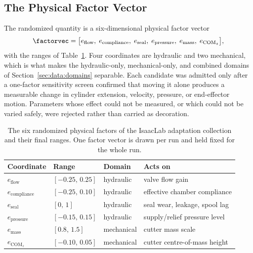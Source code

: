 \subsection{The Physical Factor Vector}
\label{sec:data:factors}

The randomized quantity is a six-dimensional physical factor vector
%
\begin{equation}
  \label{eq:data:factorvec}
  \factorvec = \bigl[
    e_{\mathrm{flow}},\;
    e_{\mathrm{compliance}},\;
    e_{\mathrm{seal}},\;
    e_{\mathrm{pressure}},\;
    e_{\mathrm{mass}},\;
    e_{\mathrm{COM}_z}
  \bigr],
\end{equation}
%
with the ranges of Table~\ref{tab:data:factors}. Four coordinates are
hydraulic and two mechanical, which is what makes the hydraulic-only,
mechanical-only, and combined domains of
Section~\ref{sec:data:domains} separable. Each candidate was admitted
only after a one-factor sensitivity screen confirmed that moving it
alone produces a measurable change in cylinder extension, velocity,
pressure, or end-effector motion. Parameters whose effect could not be
measured, or which could not be varied safely, were rejected rather than
carried as decoration.

\begin{table}[tb]
  \centering
  \caption{The six randomized physical factors of the IsaacLab
  adaptation collection and their final ranges. One factor vector is
  drawn per run and held fixed for the whole run.}
  \label{tab:data:factors}
  \small
  \begin{tabular}{llll}
    \toprule
    Coordinate & Range & Domain & Acts on \\
    \midrule
    $e_{\mathrm{flow}}$       & $[-0.25,\, 0.25]$ & hydraulic  & valve flow gain \\
    $e_{\mathrm{compliance}}$ & $[-0.25,\, 0.10]$ & hydraulic  & effective chamber compliance \\
    $e_{\mathrm{seal}}$       & $[0,\, 1]$        & hydraulic  & seal wear, leakage, spool lag \\
    $e_{\mathrm{pressure}}$   & $[-0.15,\, 0.15]$ & hydraulic  & supply/relief pressure level \\
    $e_{\mathrm{mass}}$       & $[0.8,\, 1.5]$    & mechanical & cutter mass scale \\
    $e_{\mathrm{COM}_z}$      & $[-0.10,\, 0.05]$ & mechanical & cutter centre-of-mass height \\
    \bottomrule
  \end{tabular}
\end{table}

